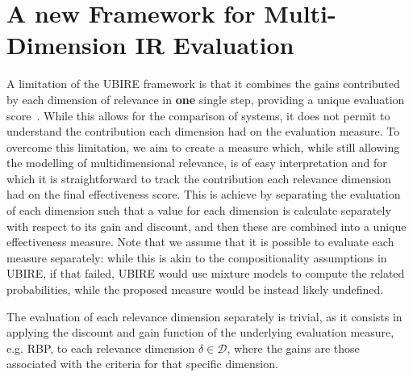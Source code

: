 
\section{A new Framework for Multi-Dimension IR Evaluation}
\label{sec:extension}

A limitation of the UBIRE framework is that it combines the gains contributed by each dimension of relevance in \textbf{one} single step, providing a unique evaluation score~\cite{zuccon14,zuccon16}.
While this allows for the comparison of systems, it does not permit to understand the contribution each dimension had on the evaluation measure. 
To overcome this limitation, we aim to create a measure which, while still allowing the modelling of multidimensional relevance, is of easy interpretation and for which it is straightforward to track the contribution each relevance dimension had on the final effectiveness score. This is achieve by separating the evaluation of each dimension such that a value for each dimension is calculate separately with respect to its gain and discount, and then these are combined into a unique effectiveness measure. Note that we assume that it is possible to evaluate each measure separately: while this is akin to the compositionality assumptions in UBIRE, if that failed, UBIRE would use mixture models to compute the related probabilities, while the proposed measure would be instead likely undefined. 

The evaluation of each relevance dimension separately is trivial, as it consists in applying the discount and gain function of the underlying evaluation measure, e.g. RBP, to each relevance dimension $\delta \in \mathcal{D}$, where the gains are those associated with the criteria for that specific dimension. 




